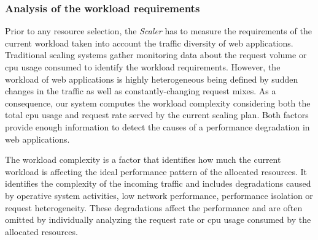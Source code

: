 


\subsubsection{Analysis of the workload requirements}

Prior to any resource selection, the \emph{Scaler} has to measure the requirements of the current workload taken into account the traffic diversity of web applications. Traditional scaling systems gather monitoring data about the request volume or cpu usage consumed to identify the workload requirements. However, the workload of web applications is highly heterogeneous being defined by sudden changes in the traffic as well as constantly-changing request mixes. As a consequence, our system computes the workload complexity considering both the total cpu usage and request rate served by the current scaling plan. Both factors provide enough information to detect the causes of a performance degradation in web applications. 


The workload complexity is a factor that identifies how much the current workload is affecting the ideal performance pattern of the allocated resources. It identifies the complexity of the incoming traffic and includes degradations caused by operative system activities, low network performance, performance isolation or request heterogeneity. These degradations affect the performance and are often omitted by individually analyzing the request rate or cpu usage consumed by the allocated resources. 

